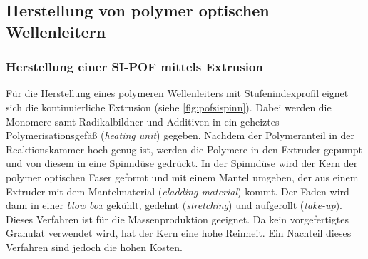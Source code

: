 \subsection{Herstellung von polymer optischen Wellenleitern}
\label{subsec:pofherstellungsverfahren}

\subsubsection{Herstellung einer SI-POF mittels Extrusion}

Für die Herstellung eines polymeren Wellenleiters mit Stufenindexprofil eignet
sich die kontinuierliche Extrusion (siehe \autoref{fig:pofsispinn}). Dabei
werden die Monomere samt Radikalbildner und Additiven in ein geheiztes
Polymerisationsgefäß (\textit{heating unit}) gegeben. Nachdem der Polymeranteil
in der Reaktionskammer hoch genug ist, werden die Polymere in den Extruder
gepumpt und von diesem in eine Spinndüse gedrückt. In der Spinndüse wird der
Kern der polymer optischen Faser geformt und mit einem Mantel umgeben, der aus
einem Extruder mit dem Mantelmaterial (\textit{cladding material}) kommt. Der
Faden wird dann in einer \textit{blow box} gekühlt, gedehnt
(\textit{stretching}) und aufgerollt (\textit{take-up}). Dieses Verfahren ist
für die Massenproduktion geeignet. Da kein vorgefertigtes Granulat verwendet
wird, hat der Kern eine hohe Reinheit. Ein Nachteil dieses Verfahren sind jedoch
die hohen Kosten.

